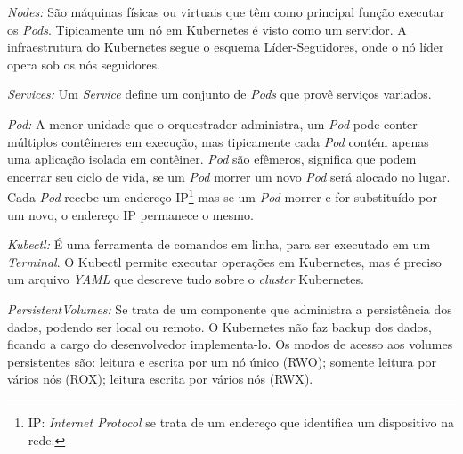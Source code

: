 \textit{Nodes:} São máquinas físicas ou virtuais que têm como principal função executar os \textit{Pods}. Tipicamente um nó em Kubernetes é visto como um servidor. A infraestrutura do Kubernetes segue o esquema Líder-Seguidores, onde o nó líder opera sob os nós seguidores.

\textit{Services:} Um \textit{Service} define um conjunto de \textit{Pods} que provê serviços variados.



\textit{Pod:} A menor unidade que o orquestrador administra, um \textit{Pod} pode conter múltiplos contêineres em execução, mas tipicamente cada \textit{Pod} contém apenas uma aplicação isolada em contêiner. \textit{Pod} são efêmeros, significa que podem encerrar seu ciclo de vida, se um \textit{Pod} morrer um novo \textit{Pod} será alocado no lugar. Cada \textit{Pod} recebe um endereço IP\footnote{IP: \textit{Internet Protocol} se trata de um endereço que identifica um dispositivo na rede.} mas se um \textit{Pod} morrer e for substituído por um novo, o endereço IP permanece o mesmo.


\textit{Kubectl:} É uma ferramenta de comandos em linha, para ser executado em um \textit{Terminal}. O Kubectl permite executar operações em Kubernetes, mas é preciso um arquivo \textit{YAML} que descreve tudo sobre o \textit{cluster} Kubernetes.


\textit{PersistentVolumes:} Se trata de um componente que administra a persistência dos dados, podendo ser local ou remoto. O Kubernetes não faz backup dos dados, ficando a cargo do desenvolvedor implementa-lo. Os modos de acesso aos volumes persistentes são: leitura e escrita por um nó único (\gls{RWO}); somente leitura por vários nós (\gls{ROX}); leitura escrita por vários nós (\gls{RWX}).

